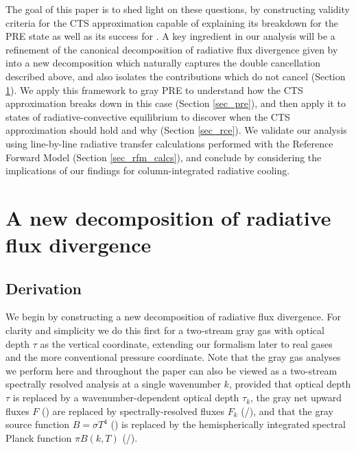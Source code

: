 \documentclass[10pt]{article}
\newcommand{\tauk}{\ensuremath{\tau_k}}
\begin{document}
The goal of this paper is to shed light on these questions, by  constructing  validity criteria for the CTS approximation capable of explaining its breakdown for the PRE state as well as its success for  \htwo.   A key ingredient in our analysis will be a refinement of the canonical decomposition of radiative flux divergence given by \cite{green1967} into a new decomposition which naturally captures the  double cancellation described above, and also isolates the contributions which do not cancel (Section \ref{sec_new_decomp}).  We apply this framework to gray PRE to understand how the CTS approximation breaks down in this case (Section \ref{sec_pre}), and then apply it to states of radiative-convective  equilibrium to discover when the CTS approximation should hold and why (Section \ref{sec_rce}).  We validate our analysis using line-by-line radiative transfer calculations performed with the Reference Forward Model (Section \ref{sec_rfm_calcs}), and conclude by considering the implications of our findings for column-integrated radiative cooling.


\section{A new decomposition of radiative flux divergence} \label{sec_new_decomp}
\subsection{Derivation} \label{sec_derivation}
We begin by constructing a new decomposition of radiative flux divergence. For clarity and simplicity we do this first for a two-stream gray gas with optical depth $\tau$ as the vertical coordinate, extending our formalism later to real gases and the more conventional pressure coordinate. Note that the gray gas analyses we perform here and throughout the paper can also be viewed as a two-stream spectrally resolved analysis at a single wavenumber $k$, provided that optical depth $\tau$ is replaced by a wavenumber-dependent optical depth $\tauk$, the gray net upward fluxes $F$ (\Wmsq)  are replaced by spectrally-resolved fluxes $F_k$ (\Wmsq/\cminverse), and that the gray source function $B=\sigma T^4$ (\Wmsq)  is replaced  by the hemispherically integrated spectral  Planck function $\pi B(k,T)$ (\Wmsq/\cminverse). 
\end{document}
